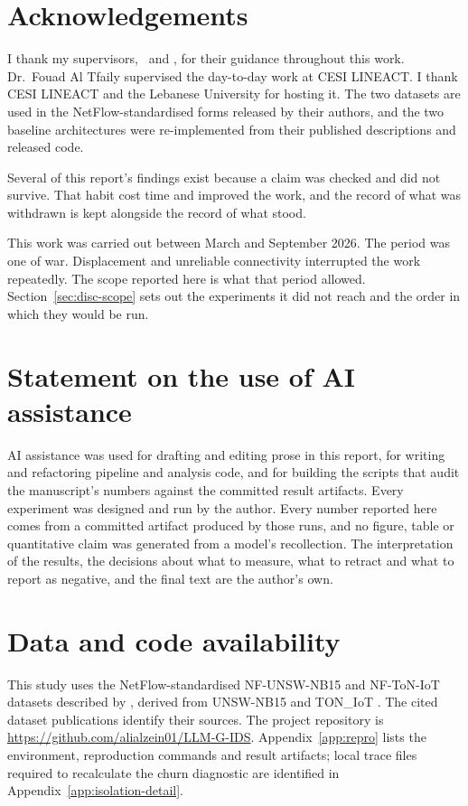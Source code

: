 \section*{Acknowledgements}

I thank my supervisors, \reportsupervisor\ and \reportsupervisortwo, for their guidance throughout this work. Dr.~Fouad Al Tfaily supervised the day-to-day work at CESI LINEACT. I thank
CESI LINEACT and the Lebanese University for hosting it. The two datasets are used in the
NetFlow-standardised forms released by their authors, and the two baseline architectures were
re-implemented from their published descriptions and released code.

Several of this report's findings exist because a claim was checked and did not survive. That
habit cost time and improved the work, and the record of what was withdrawn is kept alongside
the record of what stood.

This work was carried out between March and September 2026. The period was one of war.
Displacement and unreliable connectivity interrupted the work repeatedly. The scope reported
here is what that period allowed. Section~\ref{sec:disc-scope} sets out the experiments it did
not reach and the order in which they would be run.

\section*{Statement on the use of AI assistance}

AI assistance was used for drafting and editing prose in this report, for writing and
refactoring pipeline and analysis code, and for building the scripts that audit the
manuscript's numbers against the committed result artifacts. Every experiment was designed and
run by the author. Every number reported here comes from a committed artifact produced by
those runs, and no figure, table or quantitative claim was generated from a model's
recollection. The interpretation of the results, the decisions about what to measure, what to
retract and what to report as negative, and the final text are the author's own.

\section*{Data and code availability}

This study uses the NetFlow-standardised NF-UNSW-NB15 and NF-ToN-IoT datasets described by \citet{sarhan2021netflow}, derived from UNSW-NB15 \citep{moustafa2015unsw} and TON\_IoT \citep{moustafa2021toniot}. The cited dataset publications identify their sources. The project repository is \url{https://github.com/alialzein01/LLM-G-IDS}. Appendix~\ref{app:repro} lists the environment, reproduction commands and result artifacts; local trace files required to recalculate the churn diagnostic are identified in Appendix~\ref{app:isolation-detail}.
